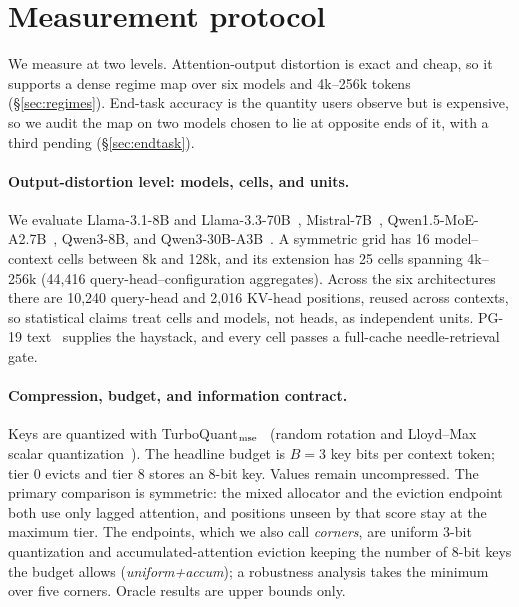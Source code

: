 \documentclass{article}
\theoremstyle{definition}
\begin{document}
\section{Measurement protocol}
\label{sec:protocol}

We measure at two levels.  Attention-output distortion is exact and cheap, so it supports a dense regime map over six models and 4k--256k tokens (\S\ref{sec:regimes}).  End-task accuracy is the quantity users observe but is expensive, so we audit the map on two models chosen to lie at opposite ends of it, with a third pending (\S\ref{sec:endtask}).

\paragraph{Output-distortion level: models, cells, and units.}
We evaluate Llama-3.1-8B and Llama-3.3-70B~\citep{grattafiori2024llama3}, Mistral-7B~\citep{jiang2023mistral}, Qwen1.5-MoE-A2.7B~\citep{qwen2024moe}, Qwen3-8B, and Qwen3-30B-A3B~\citep{yang2025qwen3}.  A symmetric grid has 16 model--context cells between 8k and 128k, and its extension has 25 cells spanning 4k--256k (44,416 query-head--configuration aggregates).  Across the six architectures there are 10,240 query-head and 2,016 KV-head positions, reused across contexts, so statistical claims treat cells and models, not heads, as independent units.  PG-19 text~\citep{rae2020pg19} supplies the haystack, and every cell passes a full-cache needle-retrieval gate.

\paragraph{Compression, budget, and information contract.}
Keys are quantized with TurboQuant$_{\rm mse}$~\citep{zandieh2025turboquant} (random rotation and Lloyd--Max scalar quantization~\citep{lloyd1982least}).  The headline budget is $B=3$ key bits per context token; tier 0 evicts and tier 8 stores an 8-bit key.  Values remain uncompressed.  The primary comparison is symmetric: the mixed allocator and the eviction endpoint both use only lagged attention, and positions unseen by that score stay at the maximum tier.  The endpoints, which we also call \emph{corners}, are uniform 3-bit quantization and accumulated-attention eviction keeping the number of 8-bit keys the budget allows (\emph{uniform+accum}); a robustness analysis takes the minimum over five corners.  Oracle results are upper bounds only.
\end{document}
